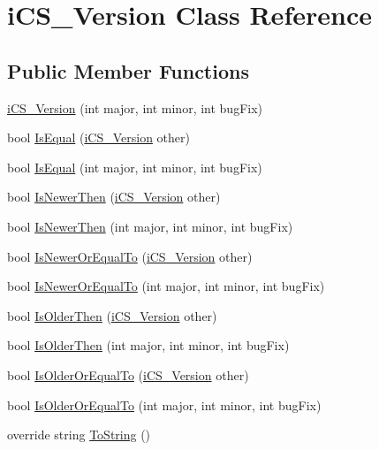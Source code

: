 \hypertarget{classi_c_s___version}{\section{i\+C\+S\+\_\+\+Version Class Reference}
\label{classi_c_s___version}
}
\subsection*{Public Member Functions}
\begin{DoxyCompactItemize}
\item 
\hyperlink{classi_c_s___version_a14c926f3a7b201b8925b7e8264f2c75a}{i\+C\+S\+\_\+\+Version} (int major, int minor, int bug\+Fix)
\item 
bool \hyperlink{classi_c_s___version_a8c5ff5b828a3dc98684f8ffc22e6c36b}{Is\+Equal} (\hyperlink{classi_c_s___version}{i\+C\+S\+\_\+\+Version} other)
\item 
bool \hyperlink{classi_c_s___version_a7fe8cd8651cc2a26659f4b3e3af7638e}{Is\+Equal} (int major, int minor, int bug\+Fix)
\item 
bool \hyperlink{classi_c_s___version_a569c7ad9c05626cbef5bc99b7a60266c}{Is\+Newer\+Then} (\hyperlink{classi_c_s___version}{i\+C\+S\+\_\+\+Version} other)
\item 
bool \hyperlink{classi_c_s___version_ac66c121fa7b88af28510367bd66da602}{Is\+Newer\+Then} (int major, int minor, int bug\+Fix)
\item 
bool \hyperlink{classi_c_s___version_aa1a4d244dae57804e4d462dbe245bcc7}{Is\+Newer\+Or\+Equal\+To} (\hyperlink{classi_c_s___version}{i\+C\+S\+\_\+\+Version} other)
\item 
bool \hyperlink{classi_c_s___version_a423bbad7c865e4ba415ba6c0fa1cb779}{Is\+Newer\+Or\+Equal\+To} (int major, int minor, int bug\+Fix)
\item 
bool \hyperlink{classi_c_s___version_afaab6a302f02a2c411bddea7abc3e8f5}{Is\+Older\+Then} (\hyperlink{classi_c_s___version}{i\+C\+S\+\_\+\+Version} other)
\item 
bool \hyperlink{classi_c_s___version_ab40cb831d7797fd4019e4a0cb7b72523}{Is\+Older\+Then} (int major, int minor, int bug\+Fix)
\item 
bool \hyperlink{classi_c_s___version_adf32ab2f34f7a0185398db6bfbf6e333}{Is\+Older\+Or\+Equal\+To} (\hyperlink{classi_c_s___version}{i\+C\+S\+\_\+\+Version} other)
\item 
bool \hyperlink{classi_c_s___version_a53ba160d6ce9baedc9b1872c98bc09a8}{Is\+Older\+Or\+Equal\+To} (int major, int minor, int bug\+Fix)
\item 
override string \hyperlink{classi_c_s___version_a30a15b58f68d23511fa70a48bf5f8d4b}{To\+String} ()
\end{DoxyCompactItemize}
